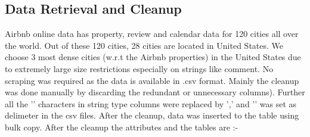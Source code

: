 \documentclass[10pt]{article}
\begin{document}
\subsection{Data Retrieval and Cleanup}
Airbnb online data has property, review and calendar data for 120 cities all over the world. Out of these 120 cities, 28 cities are located in United States. We choose 3 most dense cities (w.r.t the Airbnb properties) in the United States due to extremely large size restrictions especially on strings like comment. No scraping was required as the data is available in .csv format. 
\newline
Mainly the cleanup was done manually by discarding the redundant or unnecessary columns). Further all the '\text{\textbar}' characters in string type columns were replaced by ',' and '\text{\textbar}' was set as delimeter in the csv files. After the cleanup, data was inserted to the table using bulk copy. 
\newline 
After the cleanup the attributes and the tables are :-
\newline
\end{document}
